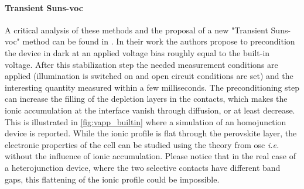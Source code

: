		\begin{figure}
		\end{figure}

		\paragraph{Transient Suns-\gls{voc}}\label{transient_suns_voc}
		A critical analysis of these methods and the proposal of a new "Transient Suns-\gls{voc}" method can be found in .
		In their work the authors propose to precondition the device in dark at an applied voltage bias roughly equal to the built-in voltage.
		After this stabilization step the needed measurement conditions are applied (illumination is switched on and open circuit conditions are set) and the interesting quantity measured within a few milliseconds.
		The preconditioning step can increase the filling of the depletion layers in the contacts, which makes the ionic accumulation at the interface vanish through diffusion, or at least decrease.
		This is illustrated in \cref{fig:vapp_builtin} where a simulation of an homojunction device is reported.
		While the ionic profile is flat through the perovskite layer, the electronic properties of the cell can be studied using the theory from \gls{osc} \textsl{i.e.} without the influence of ionic accumulation.
		Please notice that in the real case of a heterojunction device, where the two selective contacts have different band gaps, this flattening of the ionic profile could be impossible.

